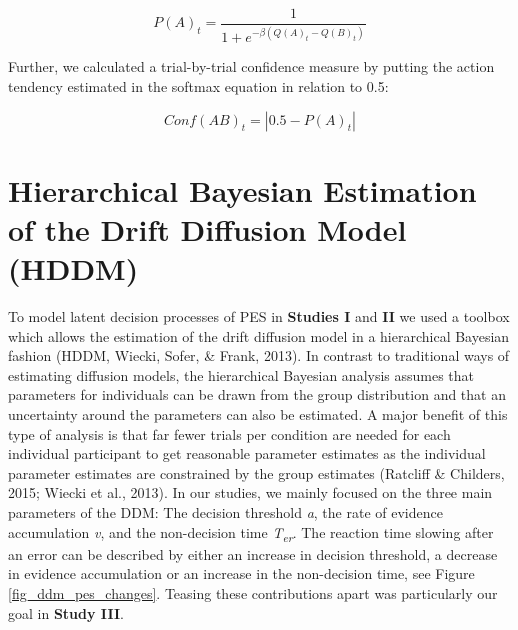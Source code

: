 \documentclass[12pt,openany]{book}
\theoremstyle{definition}
\theoremstyle{definition}
\theoremstyle{definition}
\theoremstyle{remark}
\begin{document}
\[P(A)_t = \frac{1}{1 + e^{-\beta(Q(A)_t - Q(B)_t)}}\]

Further, we calculated a trial-by-trial confidence measure by putting
the action tendency estimated in the softmax equation in relation to
0.5:

\[Conf(AB)_t = | 0.5 - P(A)_t |\]

\section{Hierarchical Bayesian Estimation of the Drift Diffusion Model
(HDDM)}\label{hierarchical-bayesian-estimation-of-the-drift-diffusion-model-hddm}

To model latent decision processes of PES in \textbf{Studies I} and
\textbf{II} we used a toolbox which allows the estimation of the drift
diffusion model in a hierarchical Bayesian fashion (HDDM, Wiecki, Sofer,
\& Frank, 2013). In contrast to traditional ways of estimating diffusion
models, the hierarchical Bayesian analysis assumes that parameters for
individuals can be drawn from the group distribution and that an
uncertainty around the parameters can also be estimated. A major benefit
of this type of analysis is that far fewer trials per condition are
needed for each individual participant to get reasonable parameter
estimates as the individual parameter estimates are constrained by the
group estimates (Ratcliff \& Childers, 2015; Wiecki et al., 2013). In
our studies, we mainly focused on the three main parameters of the DDM:
The decision threshold \emph{a}, the rate of evidence accumulation
\emph{v}, and the non-decision time \emph{T\textsubscript{er}}. The
reaction time slowing after an error can be described by either an
increase in decision threshold, a decrease in evidence accumulation or
an increase in the non-decision time, see Figure
\ref{fig_ddm_pes_changes}. Teasing these contributions apart was
particularly our goal in \textbf{Study III}.
\end{document}

